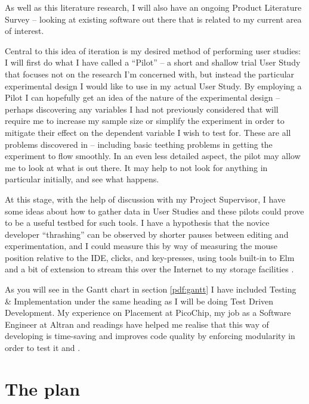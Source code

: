 \documentclass[11pt,openright,a4paper]{report}
\begin{document}
As well as this literature
research, I will also have an ongoing Product Literature Survey -- looking at
existing software out there that is related to my current area of interest.

Central to this idea of iteration
is my desired method of performing user studies: I will first do what I have called a
``Pilot'' -- a short and shallow trial User Study that focuses not on the
research I'm concerned with, but instead the particular experimental design I
would like to use in my actual User Study. By employing a Pilot I can hopefully
get an idea of the nature of the experimental design -- perhaps discovering any
variables I had not previously considered that will require me to increase my
sample size or simplify the experiment in order to mitigate their effect on the
dependent variable I wish to test for. These are all problems discovered in
\cite{Yates2012a} -- including basic teething problems in
getting the experiment to flow smoothly. In an even less detailed aspect, the
pilot may allow me to look at what is out there. It may help to not look
for anything in particular initially, and see what happens. 

At this stage, with
the help of discussion with my Project Supervisor, I have some ideas about how
to gather data in User Studies and these pilots could prove to be a useful
testbed for such tools. I have a hypothesis that the novice developer
``thrashing'' \cite{Lopez2012a} can be observed by shorter pauses between editing and
experimentation, and I could measure this by way of measuring the mouse position
relative to the IDE, clicks, and key-presses, using tools built-in to Elm and a
bit of extension to stream this over the Internet to my storage facilities
\cite{WhatFRP}.


As you will see in the Gantt chart in section
\ref{pdf:gantt} I have included Testing \& Implementation under the same heading
as I will be doing Test Driven Development. My experience on Placement at
PicoChip, my job as a Software Engineer at Altran and readings have helped me realise that this way of
developing is time-saving and improves code quality by enforcing modularity in
order to test it \cite{Martin2008a} and \cite{Hunt2000a}.


\section{The plan} 

\end{document}
